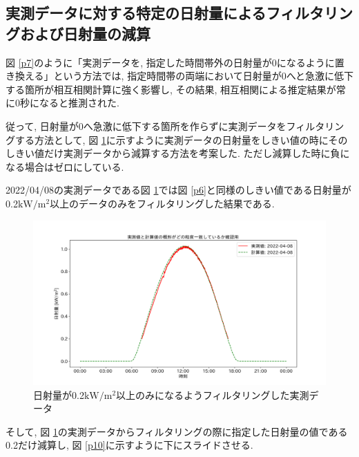 \documentclass[a4j,12pt,]{jarticle}
\begin{document}
\subsection{実測データに対する特定の日射量によるフィルタリングおよび日射量の減算}
図 \ref{p7}のように「実測データを, 指定した時間帯外の日射量が0になるように置き換える」という方法では, 指定時間帯の両端において日射量が0へと急激に低下する箇所が相互相関計算に強く影響し, その結果, 相互相関による推定結果が常に0秒になると推測された.

従って, 日射量が0へ急激に低下する箇所を作らずに実測データをフィルタリングする方法として, 図 \ref{p9}に示すように実測データの日射量をしきい値の時にそのしきい値だけ実測データから減算する方法を考案した. ただし減算した時に負になる場合はゼロにしている.

2022/04/08の実測データである図 \ref{p9}では図 \ref{p6}と同様のしきい値である日射量が0.2$\mathrm{kW}/\mathrm{m}^2$以上のデータのみをフィルタリングした結果である.

\begin{figure}[H]
  \begin{center}
    \includegraphics[width=160mm]{2022-04-08_mask_by_q_plot.png}
    \caption{日射量が0.2$\mathrm{kW}/\mathrm{m}^2$以上のみになるようフィルタリングした実測データ}
    \label{p9}
  \end{center}
\end{figure}

そして, 図 \ref{p9}の実測データからフィルタリングの際に指定した日射量の値である0.2だけ減算し, 図 \ref{p10}に示すように下にスライドさせる.
\end{document}

